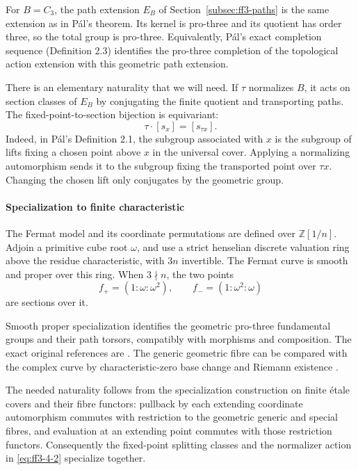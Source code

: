 For \(B=C_3\), the path extension \(E_B\) of Section~\ref{subsec:ff3-paths} is the same extension as in Pál's theorem. Its kernel is pro-three and its quotient has order three, so the total group is pro-three. Equivalently, Pál's exact completion sequence (Definition 2.3) identifies the pro-three completion of the topological action extension with this geometric path extension.

There is an elementary naturality that we will need. If \(\tau\) normalizes \(B\), it acts on section classes of \(E_B\) by conjugating the finite quotient and transporting paths. The fixed-point-to-section bijection is equivariant: \begin{equation}
\tau\cdot[s_x]=[s_{\tau x}].
\label{eq:ff3-4-2}
\end{equation} Indeed, in Pál's Definition 2.1, the subgroup associated with \(x\) is the subgroup of lifts fixing a chosen point above \(x\) in the universal cover. Applying a normalizing automorphism sends it to the subgroup fixing the transported point over \(\tau x\). Changing the chosen lift only conjugates by the geometric group.

\paragraph{Specialization to finite characteristic}

The Fermat model and its coordinate permutations are defined over \(\mathbb Z[1/n]\). Adjoin a primitive cube root \(\omega\), and use a strict henselian discrete valuation ring above the residue characteristic, with \(3n\) invertible. The Fermat curve is smooth and proper over this ring. When \(3\nmid n\), the two points \begin{equation}
f_+=(1:\omega:\omega^2),\qquad
 f_-=(1:\omega^2:\omega)
\label{eq:ff3-4-3}
\end{equation} are sections over it.

Smooth proper specialization identifies the geometric pro-three fundamental groups and their path torsors, compatibly with morphisms and composition. The exact original references are \citet[Exposé~X, Section~2, pp.~206--207; Theorem~3.8 and Corollary~3.9, p.~217 (original marginal pp.~283--284)]{SGA1}. The generic geometric fibre can be compared with the complex curve by characteristic-zero base change and Riemann existence \citep[Exposé~XII, Theorem~5.1]{SGA1}.

The needed naturality follows from the specialization construction on finite étale covers and their fibre functors: pullback by each extending coordinate automorphism commutes with restriction to the geometric generic and special fibres, and evaluation at an extending point commutes with those restriction functors. Consequently the fixed-point splitting classes and the normalizer action in \eqref{eq:ff3-4-2} specialize together.

